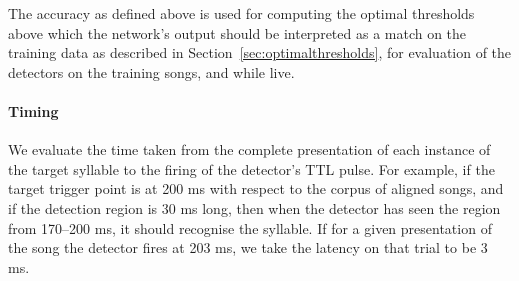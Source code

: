 \documentclass[10pt,letterpaper]{article}
\newcommand\sref[1]{Section~\ref{#1}}
\renewcommand{\subsubsection}[1]{\paragraph{#1}}
\newcommand\argmin{\mathop{\textrm{{\rm argmin}}}\limits}
\newcommand{\noprint}[1]{}
\begin{document}
The accuracy as defined above is used for computing the optimal
thresholds above which the network's output should be interpreted as a
match on the training data as described in
\sref{sec:optimalthresholds}, for evaluation of the detectors on the
training songs, and while live.

\noprint{ Since the network will output values $o_t$ between 0 and 1
  at each moment $t$ in an attempt to match the training output, the
  optimal threshold $\tau\in[0,1]$ for the output neuron should be
  computed.  Given the relative cost of false positives vs.~false
  negatives $C$, and the acceptable time difference between target
  syllable and correct output $\Delta t_d$, we compute the optimal
  threshold for an output element according to the definitions above:
\begin{eqnarray*}
  \textrm{true positives}_\tau &=& \textrm{size of set}_{s\in \textrm{target songs}} o_t > \tau, \left| t \leq \Delta t_d \right| \\
  \textrm{false negatives}_\tau &=& \textrm{size of set} {s\in\textrm{target songs}} - \textrm{size of set} \textrm{true positives} \\
  \textrm{false positives}_\tau &=& \textrm{size of set}_{s\in \textrm{target songs}} o_t > \tau, \left| t > \Delta t_d \right| \\
  \widehat{\tau} &=& \argmin_\tau C\textrm{false positive} + \textrm{false negatives}
\end{eqnarray*}
}

\subsubsection{Timing}


We evaluate the time taken from the complete presentation of each
instance of the target syllable to the firing of the detector's TTL
pulse.  For example, if the target trigger point is at 200 ms with
respect to the corpus of aligned songs, and if the detection region is
30 ms long, then when the detector has seen the region from 170--200
ms, it should recognise the syllable.  If for a given presentation of
the song the detector fires at 203 ms, we take the latency on that
trial to be 3 ms.
\end{document}
